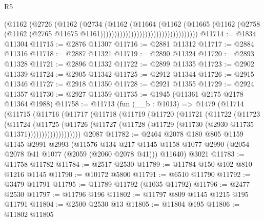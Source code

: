 \begin{lexlean}{R5}
\begin{coremodule}
                                                  (@1162
                                                    (@2726
                                                      (@1162
                                                        (@2734
                                                          (@1162
                                                            (@11664
                                                              (@1162
                                                                (@11665
                                                                  (@1162
                                                                    (@2758
                                                                      (@1162
                                                                        (@2765
                                                                          @11675
                                                                          @1161)))))))))))))))))))))))))))))))))))
@11714 := @1834 @11304
@11715 := @2876 @11307
@11716 := @2881 @11312
@11717 := @2884 @11316
@11718 := @2887 @11321
@11719 := @2890 @11324
@11720 := @2893 @11328
@11721 := @2896 @11332
@11722 := @2899 @11335
@11723 := @2902 @11339
@11724 := @2905 @11342
@11725 := @2912 @11344
@11726 := @2915 @11346
@11727 := @2918 @11350
@11728 := @2921 @11355
@11729 := @2924 @11357
@11730 := @2927 @11359
@11735 := @1945 (@11361 @2175 @2178 @11364 @1988)
@11758 := @11713
    (fun (__b : @1013) =>
    @1479
      (@11714
        (@11715
          (@11716
            (@11717
              (@11718
                (@11719
                  (@11720
                    (@11721
                      (@11722
                        (@11723
                          (@11724
                            (@11725
                              (@11726
                                (@11727
                                  (@11728 (@11729 (@11730 (@2930 @11735 @11371)))))))))))))))))))
    @2087
@11782 := @2464
    @2078
    @180
    @805
    @1159
    @1145
    @2991
    @2993
    (@11576
      @134
      @217
      @1145
      @1158
      @1077
      @2990
      (@2054 @2078 @41 @1077 (@2059 (@2060 @2078 @41)))
      @11640)
    @3021
@11783 := @11758 @11782
@11784 := @2517 @2530
@11789 := @11784 @150 @102 @810 @1216 @1145
@11790 := @10172 @5800
@11791 := @6510 @11790
@11792 := @3479 @11791
@11795 := @11789 @11792 (@1035 @11792)
@11796 := @2477 @2530
@11797 := @11796 @196
@11802 := @11797 @809 @1145 @1215 @195 @11791
@11804 := @2500 @2530 @13
@11805 := @11804 @195
@11806 := @11802 @11805

\end{coremodule}
\end{lexlean}
